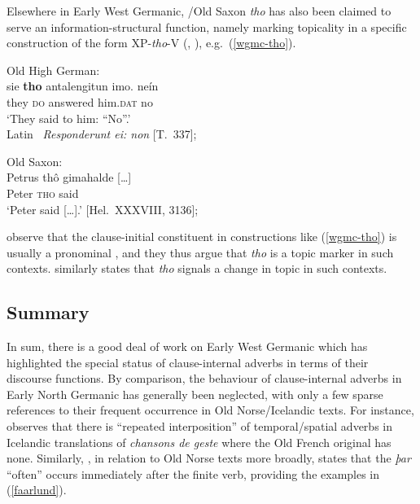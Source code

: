\documentclass[output=paper,colorlinks,citecolor=brown]{langscibook}
\begin{document}
Elsewhere in Early West Germanic, /Old Saxon \textit{tho} has also been claimed to serve an information-structural function, namely marking topicality in a specific  construction of the form XP-\textit{tho}-V  (\citealp[224--225]{Axel2007}, \citealp{catasso2021he}), e.g.~(\ref{wgmc-tho}).

\ea \label{wgmc-tho}
\ea Old High German:\\
\gll sie \textbf{tho} antalengitun imo. neín\\
they \textsc{do} answered him.\textsc{dat} no\\
\glt `They said to him: ``No''.'\\
Latin ~\textit{Responderunt ei: non} \hfill [T.~337]; \citep[2]{catasso2021he}
    
\ex Old Saxon:\\
\gll Petrus th{\^o} gimahalde [\dots]\\
Peter \textsc{tho} said \\
\glt `Peter said [\dots].' \hfill [Hel.~XXXVIII, 3136]; \citep[2]{catasso2021he}   
\z 
\z 

\noindent \citet{catasso2021he} observe that the clause-initial constituent in constructions like (\ref{wgmc-tho}) is usually a pronominal , and they thus argue that \textit{tho} is a topic marker in such contexts. \citet[225]{Axel2007} similarly states that \textit{tho} signals a change in topic in such contexts.

\subsection{Summary}

In sum, there is a good deal of work on Early West Germanic which has highlighted the special status of clause-internal adverbs in terms of their discourse functions. By comparison, the behaviour of clause-internal adverbs in Early North Germanic has generally been neglected, with only a few sparse references to their frequent occurrence in Old Norse/Icelandic texts. 
For instance, \citet[71]{clover1974scene} observes that there is ``repeated interposition'' of temporal/spatial adverbs in Icelandic translations of \textit{chansons de geste} where the Old French original has none. Similarly, \citet[71]{Faarlund1990}, in relation to Old Norse texts more broadly, states that the  \textit{þar} ``often'' occurs immediately after the finite verb, providing the examples in (\ref{faarlund}).
\end{document}
